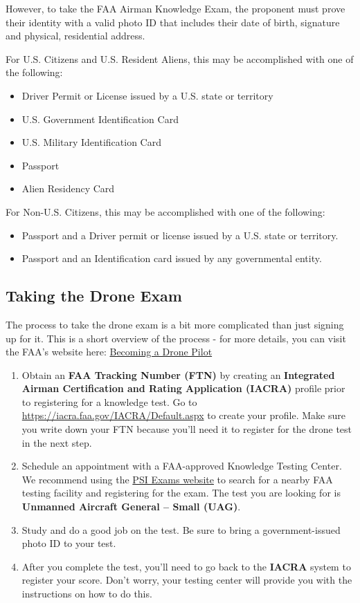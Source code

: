 \documentclass[
  12pt,
]{book}
\providecommand{\tightlist}{%
  \setlength{\itemsep}{0pt}\setlength{\parskip}{0pt}}
\begin{document}
However, to take the FAA Airman Knowledge Exam, the proponent must prove their identity with a valid photo ID that includes their date of birth, signature and physical, residential address.

For U.S. Citizens and U.S. Resident Aliens, this may be accomplished with one of the following:

\begin{itemize}
\tightlist
\item
  Driver Permit or License issued by a U.S. state or territory
\item
  U.S. Government Identification Card
\item
  U.S. Military Identification Card
\item
  Passport
\item
  Alien Residency Card
\end{itemize}

For Non-U.S. Citizens, this may be accomplished with one of the following:

\begin{itemize}
\tightlist
\item
  Passport and a Driver permit or license issued by a U.S. state or territory.
\item
  Passport and an Identification card issued by any governmental entity.
\end{itemize}

\subsection{Taking the Drone Exam}\label{taking-the-drone-exam}

The process to take the drone exam is a bit more complicated than just signing up for it. This is a short overview of the process - for more details, you can visit the FAA's website here: \href{https://www.faa.gov/uas/commercial_operators/become_a_drone_pilot/}{Becoming a Drone Pilot}

\begin{enumerate}
\def\labelenumi{\arabic{enumi}.}
\item
  Obtain an \textbf{FAA Tracking Number (FTN)} by creating an \textbf{Integrated Airman Certification and Rating Application (IACRA)} profile prior to registering for a knowledge test. Go to \url{https://iacra.faa.gov/IACRA/Default.aspx} to create your profile. Make sure you write down your FTN because you'll need it to register for the drone test in the next step.
\item
  Schedule an appointment with a FAA-approved Knowledge Testing Center. We recommend using the \href{https://faa.psiexams.com/faa/login}{PSI Exams website} to search for a nearby FAA testing facility and registering for the exam. The test you are looking for is \textbf{Unmanned Aircraft General -- Small (UAG)}.
\item
  Study and do a good job on the test. Be sure to bring a government-issued photo ID to your test.
\item
  After you complete the test, you'll need to go back to the \textbf{IACRA} system to register your score. Don't worry, your testing center will provide you with the instructions on how to do this.
\end{enumerate}
\end{document}
